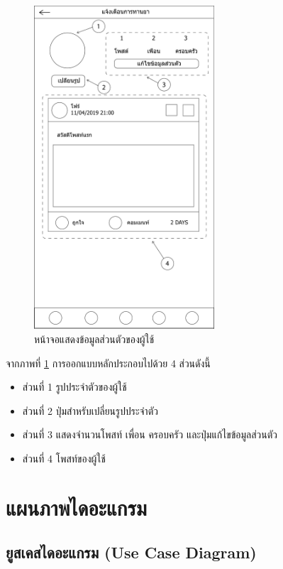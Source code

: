 		\begin{figure}[H]
			\centering
			\includegraphics[width=0.6\textwidth]{Figures/3/UI/profile}
			\caption{หน้าจอแสดงข้อมูลส่วนตัวของผู้ใช้}
			\label{Fig:โปรไฟล์}
		\end{figure}
		จากภาพที่ \ref{Fig:โปรไฟล์} การออกแบบหลักประกอบไปด้วย 4 ส่วนดังนี้
		\begin{itemize}
			\item ส่วนที่ 1 รูปประจำตัวของผู้ใช้
			\item ส่วนที่ 2 ปุ่มสำหรับเปลี่ยนรูปประจำตัว
			\item ส่วนที่ 3 แสดงจำนวนโพสท์ เพื่อน ครอบครัว และปุ่มแก้ไขข้อมูลส่วนตัว
			\item ส่วนที่ 4 โพสท์ของผู้ใช้
		\end{itemize}
\newpage


\section{แผนภาพไดอะแกรม}


\subsection{ยูสเคสไดอะแกรม (Use Case Diagram)}

